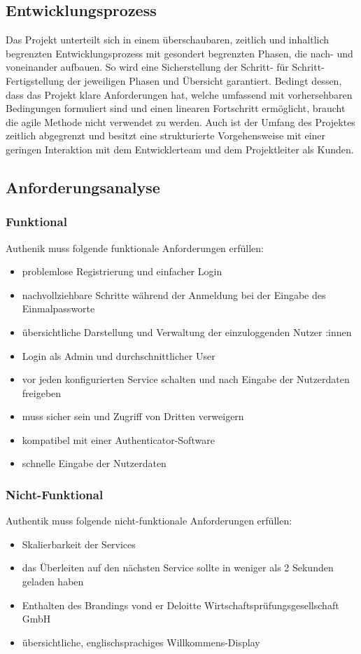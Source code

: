 \subsection{Entwicklungsprozess}
\label{sec:Entwicklungsprozess}
Das Projekt unterteilt sich in einem überschaubaren, zeitlich und inhaltlich begrenzten Entwicklungsprozess 
mit gesondert begrenzten Phasen, die nach- und voneinander aufbauen. So wird eine Sicherstellung der Schritt- 
für Schritt-Fertigstellung der jeweiligen Phasen und Übersicht garantiert. Bedingt dessen, dass das Projekt klare Anforderungen 
hat, welche umfassend mit vorhersehbaren Bedingungen formuliert sind und einen linearen Fortschritt ermöglicht, braucht 
die agile Methode nicht verwendet zu werden. Auch ist der Umfang des Projektes zeitlich abgegrenzt und besitzt eine 
strukturierte Vorgehensweise mit einer geringen Interaktion mit dem Entwicklerteam und dem Projektleiter als Kunden.

\subsection{Anforderungsanalyse}
\label{sec:Anforderungsanalyse}

\subsubsection{Funktional}
\label{sec:Funktional}
Authenik muss folgende funktionale Anforderungen erfüllen:
\begin{itemize} [label=--]
	\item problemlose Registrierung und einfacher Login
	\item nachvollziehbare Schritte während der Anmeldung bei der Eingabe des Einmalpassworte
	\item übersichtliche Darstellung und Verwaltung der einzuloggenden Nutzer :innen
	\item Login als Admin und durchschnittlicher User
	\item vor jeden konfigurierten Service schalten und nach Eingabe der Nutzerdaten freigeben
	\item muss sicher sein und Zugriff von Dritten verweigern
	\item kompatibel mit einer Authenticator-Software
	\item schnelle Eingabe der Nutzerdaten
\end{itemize}

\subsubsection{Nicht-Funktional}
\label{sec:Nicht-Funktional}
Authentik muss folgende nicht-funktionale Anforderungen erfüllen:
\begin{itemize} [label=--]
	\item Skalierbarkeit der Services
	\item das Überleiten auf den nächsten Service sollte in weniger als 2 Sekunden geladen haben
	\item Enthalten des Brandings vond er Deloitte Wirtschaftsprüfungsgesellschaft GmbH
	\item übersichtliche, englischsprachiges Willkommens-Display
\end{itemize}
	